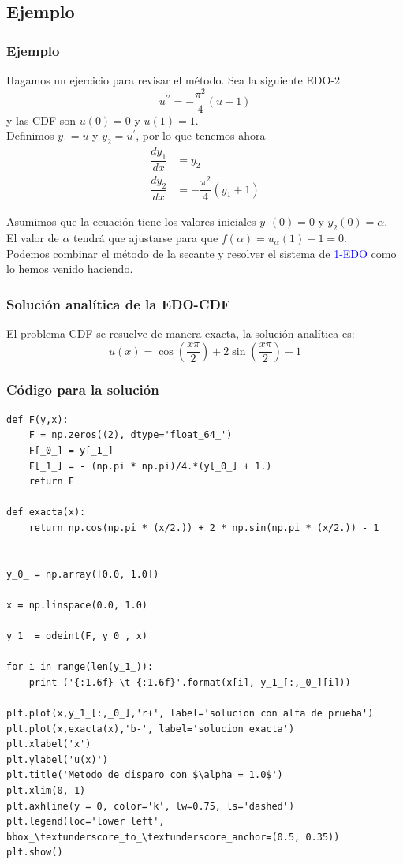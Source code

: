 \subsection{Ejemplo}
\begin{frame}
\frametitle{Ejemplo}
Hagamos un ejercicio para revisar el método. Sea la siguiente EDO-2
\begin{equation}
u^{\prime \prime} = - \dfrac{\pi^{2}}{4}(u + 1)
\end{equation}
y las CDF son $u(0) = 0$ y $u(1) = 1$. 
\\
\bigskip
\pause
Definimos $y_{1} = u$ y $y_{2} = u^{\prime}$, por lo que tenemos ahora
\begin{align*}
\dfrac{dy_{1}}{dx} &= y_{2} \\
\dfrac{dy_{2}}{dx} &= - \dfrac{\pi^{2}}{4}(y_{1} + 1)
\end{align*}
\end{frame}
\begin{frame}
Asumimos que la ecuación tiene los valores iniciales $y_{1}(0) = 0$ y $y_{2}(0) = \alpha$.
\\
\bigskip
\pause
El valor de $\alpha$ tendrá que ajustarse para que $f(\alpha) = u_{\alpha}(1) - 1 = 0$.
\\
\bigskip
Podemos combinar el método de la secante y resolver el sistema de \textcolor{blue}{1-EDO} como lo hemos venido haciendo.
\end{frame}
\begin{frame}
\frametitle{Solución analítica de la EDO-CDF}
El problema CDF se resuelve de manera exacta, la solución analítica es:
\begin{equation}
u(x) = \cos\left(\frac{x \pi}{2}\right) + 2 \sin \left(\frac{x \pi}{2}\right) -1
\end{equation}
\end{frame}
\begin{frame}
\frametitle{Código para la solución}
\begin{lstlisting}[caption=Código para el método de disparo, style=FormattedNumber, basicstyle=\linespread{1.1}\ttfamily=\small, columns=fullflexible]
def F(y,x):
    F = np.zeros((2), dtype='float_64_')
    F[_0_] = y[_1_]
    F[_1_] = - (np.pi * np.pi)/4.*(y[_0_] + 1.)
    return F

def exacta(x):
    return np.cos(np.pi * (x/2.)) + 2 * np.sin(np.pi * (x/2.)) - 1


y_0_ = np.array([0.0, 1.0])

x = np.linspace(0.0, 1.0)

y_1_ = odeint(F, y_0_, x)

for i in range(len(y_1_)):
    print ('{:1.6f} \t {:1.6f}'.format(x[i], y_1_[:,_0_][i]))

plt.plot(x,y_1_[:,_0_],'r+', label='solucion con alfa de prueba')
plt.plot(x,exacta(x),'b-', label='solucion exacta')
plt.xlabel('x')
plt.ylabel('u(x)')
plt.title('Metodo de disparo con $\alpha = 1.0$')
plt.xlim(0, 1)
plt.axhline(y = 0, color='k', lw=0.75, ls='dashed')
plt.legend(loc='lower left', bbox_\textunderscore_to_\textunderscore_anchor=(0.5, 0.35))
plt.show()
\end{lstlisting}
\end{frame}
